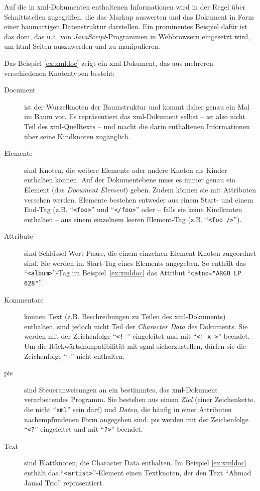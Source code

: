 Auf die in \acrshort{xml}-Dokumenten enthaltenen Informationen wird in der Regel über Schnittstellen zugegriffen, die das Markup auswerten und das Dokument in Form einer baumartigen Datenstruktur darstellen. Ein prominentes Beispiel dafür ist das \acrfull{dom}, das u.a. von \emph{JavaScript}-Programmen in Webbrowsern eingesetzt wird, um  \acrshort{html}-Seiten auszuwerden und zu manipulieren.

Das Beispiel \ref{ex:xmldoc} zeigt ein \acrshort{xml}-Dokument, das aus mehreren verschiedenen Knotentypen besteht:

\begin{description}
    \item[Document] ist der Wurzelknoten der Baumstruktur und kommt daher genau ein Mal im Baum vor. Es repräsentiert das \acrshort{xml}-Dokument selbst -- ist also nicht Teil des \acrshort{xml}-Quelltexts -- und macht die darin enthaltenen Informationen über seine Kindknoten zugänglich.~\cite[Abschnitt 2.1]{xmlinfoset}
    \item[Elemente] sind Knoten, die weitere Elemente oder andere Knoten als Kinder enthalten können. Auf der Dokumentebene muss es immer genau ein Element (das \emph{Document Element}) geben. Zudem können sie mit Attributen versehen werden. Elemente bestehen entweder aus einem Start- und einem End-Tag (z.B. \enquote{\texttt{<foo>}} und \enquote{\texttt{</foo>}} oder -- falls sie keine Kindknoten enthalten -- aus einem einzelnem leeren Element-Tag (z.B. \enquote{\texttt{<foo />}}).
    \item[Attribute] sind Schlüssel-Wert-Paare, die einem einzelnen Element-Knoten zugeordnet sind. Sie werden im Start-Tag eines Elements angegeben. So enthält das \enquote{\texttt{<album>}}-Tag im Beispiel~\ref{ex:xmldoc} das Attribut \enquote{\texttt{catno="ARGO LP 628"}}.
    \item[Kommentare] können Text (z.B. Beschreibungen zu Teilen des \acrshort{xml}-Dokuments) enthalten, sind jedoch nicht Teil der \emph{Character Data} des Dokuments. Sie werden mit der Zeichenfolge \enquote{\texttt{<!--}} eingeleitet und mit \enquote{\texttt{<!--x-->}} beendet. Um die Rückwärtskompatibilität mit \acrshort{sgml} sicherzustellen, dürfen sie die Zeichenfolge \enquote{\texttt{--}} nicht enthalten.~\cite[Abschnitt 2.5]{xml}
    \item[\glspl{pi}] sind Steueranweisungen an ein bestimmtes, das \acrshort{xml}-Dokument verarbeitendes Programm. Sie bestehen aus einem \emph{Ziel} (einer Zeichenkette, die nicht \enquote{\texttt{xml}} sein darf) und \emph{Daten}, die häufig in einer Attributen nachempfundenen Form angegeben sind. \glspl{pi} werden mit der Zeichenfolge \enquote{\texttt{<?}} eingeleitet und mit \enquote{\texttt{?>}} beendet.~\cite[Abschnitt 2.6]{xml}
    \item[Text] sind Blattknoten, die Character Data enthalten. Im Beispiel \ref{ex:xmldoc} enthält das \linebreak{}\enquote{\texttt{<artist>}}-Element einen Textknoten, der den Text \enquote{Ahmad Jamal Trio} repräsentiert.
\end{description}

